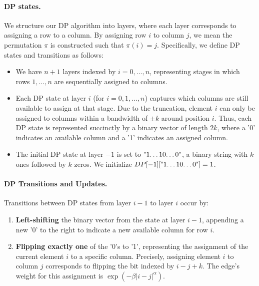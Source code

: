 \documentclass{article}
\begin{document}
\paragraph{DP states.}
We structure our DP algorithm into layers, where each layer corresponds to assigning a row  to a column. 
By assigning row $i$ to column $j$, we mean the permutation $\pi$ is constructed such that $\pi(i) = j$.
Specifically, we define DP states and transitions as follows:
\begin{itemize}
\item We have $n+1$ layers indexed by $i =  0, \dots, n$, representing stages in which rows $1, \dots, n$ are sequentially assigned to columns.
\item Each DP state at layer $i$ (for $i = 0, 1, \dots, n$) captures which columns are still available to assign at that stage. Due to the truncation, element $i$ can only be assigned to columns within a bandwidth of $\pm k$ around position $i$. Thus, each DP state is represented succinctly by a binary vector of length $2k$, where a '0' indicates an available column and a '1' indicates an assigned column.
\item The initial DP state at layer $-1$ is set to $\text{"1\dots10\dots0"}$, a binary string with $k$ ones followed by $k$ zeros. We initialize $DP[-1][\text{"1\dots10\dots0"}] = 1$.
\end{itemize}

\paragraph{DP Transitions and Updates.}
Transitions between DP states from layer $i-1$ to layer $i$ occur by:

\begin{enumerate}
\item \textbf{Left-shifting} the binary vector from the state at layer $i-1$, appending a new '0' to the right to indicate a new available column for row $i$.
\item \textbf{Flipping exactly one} of the '0's to '1', representing the assignment of the current element $i$ to a specific column. Precisely, assigning element $i$ to column $j$ corresponds to flipping the bit indexed by $i - j + k$. The edge's weight for this assignment is $\exp(-\beta|i-j|^\alpha)$.
\end{enumerate}
\end{document}

